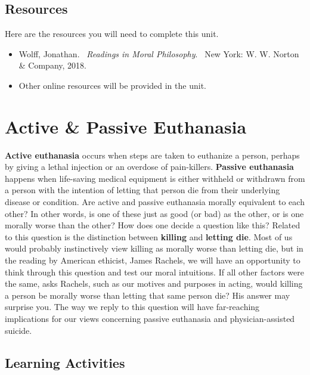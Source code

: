 \documentclass[
]{book}
\providecommand{\tightlist}{%
  \setlength{\itemsep}{0pt}\setlength{\parskip}{0pt}}
\begin{document}
\hypertarget{resources-7}{%
\subsection*{Resources}\label{resources-7}}

Here are the resources you will need to complete this unit.

\begin{itemize}
\tightlist
\item
  Wolff, Jonathan. ~\emph{Readings in Moral Philosophy}. ~New York: W. W. Norton \& Company, 2018.\\
\item
  Other online resources will be provided in the unit.
\end{itemize}

\hypertarget{active-passive-euthanasia}{%
\section*{Active \& Passive Euthanasia}\label{active-passive-euthanasia}}

\textbf{Active euthanasia} occurs when steps are taken to euthanize a person, perhaps by giving a lethal injection or an overdose of pain-killers. \textbf{Passive euthanasia} happens when life-saving medical equipment is either withheld or withdrawn from a person with the intention of letting that person die from their underlying disease or condition.
Are active and passive euthanasia morally equivalent to each other? In other words, is one of these just as good (or bad) as the other, or is one morally worse than the other? How does one decide a question like this?
Related to this question is the distinction between \textbf{killing} and \textbf{letting die}. Most of us would probably instinctively view killing as morally worse than letting die, but in the reading by American ethicist, James Rachels, we will have an opportunity to think through this question and test our moral intuitions.
If all other factors were the same, asks Rachels, such as our motives and purposes in acting, would killing a person be morally worse than letting that same person die? His answer may surprise you. The way we reply to this question will have far-reaching implications for our views concerning passive euthanasia and physician-assisted suicide.

\hypertarget{learning-activities-19}{%
\subsection*{Learning Activities}\label{learning-activities-19}}
\end{document}
